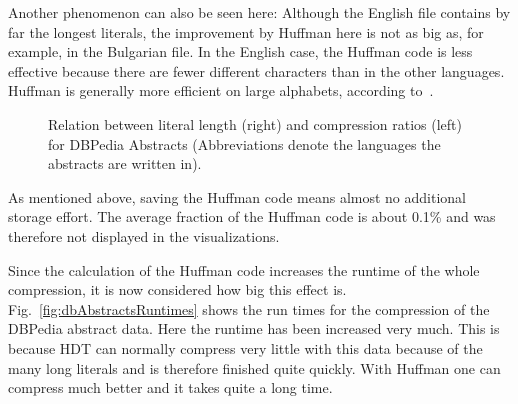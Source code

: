 Another phenomenon can also be seen here: Although the English file contains by far the longest literals, the improvement by Huffman here is not as big as, for example, in the Bulgarian file. In the English case, the Huffman code is less effective because there are fewer different characters than in the other languages. Huffman is generally more efficient on large alphabets, according to~\cite{huffman}.

\begin{figure}[h]
	\centering
	\hfill
	\caption{Relation between literal length (right) and compression ratios (left) for DBPedia Abstracts (Abbreviations denote the languages the abstracts are written in).}
	\label{fig:dbAbstracts}
\end{figure}

As mentioned above, saving the Huffman code means almost no additional storage effort. The average fraction of the Huffman code is about 0.1\% and was therefore not displayed in the visualizations.

Since the calculation of the Huffman code increases the runtime of the whole compression, it is now considered how big this effect is. Fig.~\ref{fig:dbAbstractsRuntimes} shows the run times for the compression of the DBPedia abstract data. Here the runtime has been increased very much. This is because HDT can normally compress very little with this data because of the many long literals and is therefore finished quite quickly. With Huffman one can compress much better and it takes quite a long time.

